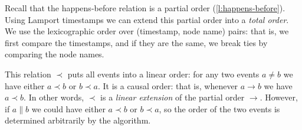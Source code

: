 Recall that the happens-before relation is a partial order (\autoref{l:happens-before}).
Using Lamport timestamps we can extend this partial order into a \emph{total order}.
We use the lexicographic order over (timestamp, node name) pairs: that is, we first compare the timestamps, and if they are the same, we break ties by comparing the node names.

This relation $\prec$ puts all events into a linear order: for any two events $a \neq b$ we have either $a \prec b$ or $b \prec a$.
It is a causal order: that is, whenever $a \rightarrow b$ we have $a \prec b$.
In other words, $\prec$ is a \emph{linear extension} of the partial order $\rightarrow$.
However, if $a \parallel b$ we could have either $a \prec b$ or $b \prec a$, so the order of the two events is determined arbitrarily by the algorithm.

